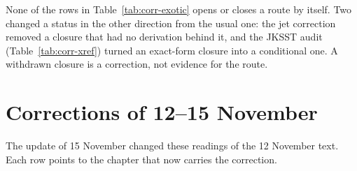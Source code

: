 None of the rows in Table~\ref{tab:corr-exotic} opens or closes a route by
itself. Two changed a status in the other direction from the usual one: the
jet correction removed a closure that had no derivation behind it, and the
JKSST audit (Table~\ref{tab:corr-xref}) turned an exact-form closure into a
conditional one. A withdrawn closure is a correction, not evidence for the
route.

\section{Corrections of 12--15 November}\label{sec:corr-nov15}

The update of 15 November changed these readings of the 12 November text.
Each row points to the chapter that now carries the correction.

